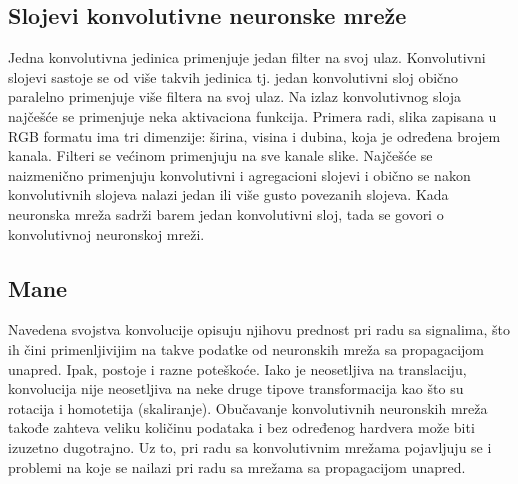 \subsection{Slojevi konvolutivne neuronske mreže}
Jedna konvolutivna jedinica primenjuje jedan filter na svoj ulaz. Konvolutivni slojevi sastoje se od više takvih jedinica tj. jedan konvolutivni sloj obično paralelno primenjuje više filtera na svoj ulaz. Na izlaz konvolutivnog sloja najčešće se primenjuje neka aktivaciona funkcija. Primera radi, slika zapisana u RGB formatu ima tri dimenzije: širina, visina i dubina, koja je određena brojem kanala. Filteri se većinom primenjuju na sve kanale slike.
Najčešće se naizmenično primenjuju konvolutivni i agregacioni slojevi i obično se nakon konvolutivnih slojeva nalazi jedan ili više gusto povezanih slojeva. Kada neuronska mreža sadrži barem jedan konvolutivni sloj, tada se govori o konvolutivnoj neuronskoj mreži.

\subsection{Mane}

Navedena svojstva konvolucije opisuju njihovu prednost pri radu sa signalima, što ih čini primenljivijim na takve podatke od neuronskih mreža sa propagacijom unapred. Ipak, postoje i razne poteškoće. Iako je neosetljiva na translaciju, konvolucija nije neosetljiva na neke druge tipove transformacija kao što su rotacija i homotetija (skaliranje). Obučavanje konvolutivnih neuronskih mreža takođe zahteva veliku količinu podataka i bez određenog hardvera može biti izuzetno dugotrajno. Uz to, pri radu sa konvolutivnim mrežama pojavljuju se i problemi na koje se nailazi pri radu sa mrežama sa propagacijom unapred.
